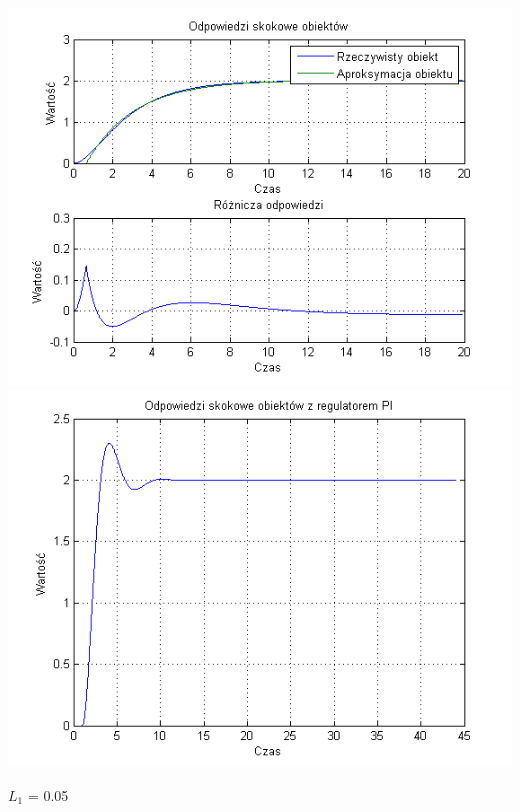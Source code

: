 \documentclass[10pt,a4paper]{article}
\begin{document}
\begin{center}
\includegraphics[scale=1]{images/jeden/skrypt_173.png}\\
\includegraphics[scale=1]{images/jeden/skrypt_174.png}\\
\end{center}
\newpage
$L_1$ = 0.05
\end{document}
